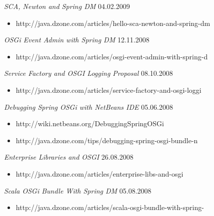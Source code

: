 \documentclass{res}
\begin{document}
\begin{resume}
{{\sl SCA, Newton and Spring DM}  \hfill    04.02.2009	\\
\vspace{-5mm}  \begin{itemize}
\item[]  \scriptsize http://java.dzone.com/articles/hello-sca-newton-and-spring-dm
\end{itemize}
\vspace{-2mm}

{\sl OSGi Event Admin with Spring DM}  \hfill   12.11.2008 \\
\vspace{-5mm}  \begin{itemize}
\item[]  \scriptsize http://java.dzone.com/articles/osgi-event-admin-with-spring-d
\end{itemize}
\vspace{-2mm}

{\sl Service Factory and OSGI Logging Proposal}  \hfill   08.10.2008	\\
\vspace{-5mm}  \begin{itemize}
\item[]  \scriptsize http://java.dzone.com/articles/service-factory-and-osgi-loggi
\end{itemize}
\vspace{-2mm}

{\sl Debugging Spring OSGi with NetBeans IDE}  \hfill   05.06.2008	\\
\vspace{-5mm}  \begin{itemize}
\item[]  \scriptsize http://wiki.netbeans.org/DebuggingSpringOSGi
\vspace{-2mm}
\item[]  \scriptsize http://java.dzone.com/tips/debugging-spring-osgi-bundle-n
\end{itemize}
\vspace{-2mm}

{\sl Enterprise Libraries and OSGI}  \hfill   26.08.2008	\\
\vspace{-5mm}  \begin{itemize}
\item[]  \scriptsize http://java.dzone.com/articles/enterprise-libs-and-osgi
\end{itemize}
\vspace{-2mm}

{\sl Scala OSGi Bundle With Spring DM}  \hfill   05.08.2008	\\
\vspace{-5mm}  \begin{itemize}
\item[]  \scriptsize http://java.dzone.com/articles/scala-osgi-bundle-with-spring-
\end{itemize}
\vspace{-2mm}

}
\end{resume}
\end{document}
